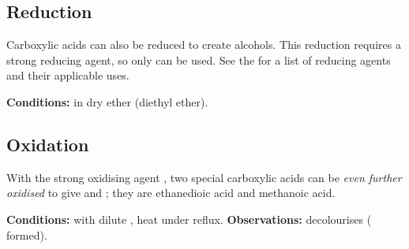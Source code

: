 
		\pagebreak
		\subsection{Reduction}

			Carboxylic acids can also be reduced to create alcohols. This reduction requires a strong reducing agent, so only
			 can be used. See the \hyperlink{AppendixReducingAgents}{} for a list of reducing agents
			and their applicable uses.

			\vspace{1.5em}
			\vbox{\textbf{Conditions:}\tabto{35mm} in dry ether (diethyl ether).}




		\subsection{Oxidation}

			With the strong oxidising agent , two special carboxylic acids can be \textit{even further oxidised} to give 
			and ; they are ethanedioic acid and methanoic acid.


			\vspace{1.5em}
			\vbox{\textbf{Conditions:}	\tabto{35mm} with dilute ,
										\tabto{35mm}heat under reflux.}
			\vspace{0.75em}
			\vbox{\textbf{Observations:}\tabto{35mm}  decolourises ( formed).}
















